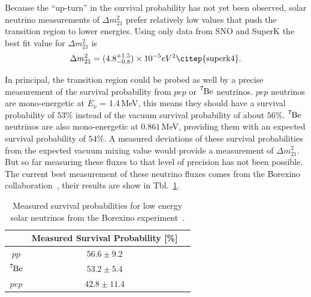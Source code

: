 Because the ``up-turn'' in the survival probability has not yet been observed,
solar neutrino measurements of $\Delta m^{2}_{21}$ prefer relatively low values
that push the transition region to lower energies.
Using only data from SNO and SuperK the best fit value for 
$\Delta m^{2}_{21}$ is
\begin{equation*}
    \Delta m^{2}_{21} = (4.8^{+1.5}_{-0.8})\times 10^{-5} eV^{2}\text{\citep{superk4}.}
\end{equation*}


In principal, the transition region could be probed as well by a precise
measurement of the survival probability from $pep$ or $\ce{^{7}Be}$ neutrinos.
$pep$ neutrinos are mono-energetic at $E_{\nu}$ = 1.4\,MeV,
this means they should have a survival probability of $53\%$ instead of the
vacuum survival probability of about $56\%$.
$\ce{^{7}Be}$ neutrinos are also mono-energetic at $0.861$\,MeV, providing
them with an expected survival probability of $54\%$.
A measured deviations of these survival probabilities from the expected
vacuum mixing value would provide a measurement of $\Delta m^{2}_{21}$.
But so far measuring these fluxes to that level of precision has not been
possible.
The current best measurement of these neutrino fluxes comes from the Borexino
collaboration~\citep{borexino_nature}, their results are show in Tbl.~\ref{tbl:borexino_results}.
\begin{table}
    \centering
    \begin{tabular} {c| c c}
        & Measured Survival Probability [\%]\\
        \hline
        $pp$ & $56.6 \pm  9.2$\\
        $\ce{^{7}Be}$ & $53.2\pm 5.4$ \\
        $pep$ & $42.8\pm11.4$ \\
    \end{tabular}
    \caption[Borexino Measured Low Energy Survival Probabilities]{
        Measured survival probabilities for low energy solar neutrinos
        from the Borexino experiment~\citep{borexino_nature}.}
    \label{tbl:borexino_results}
\end{table}

